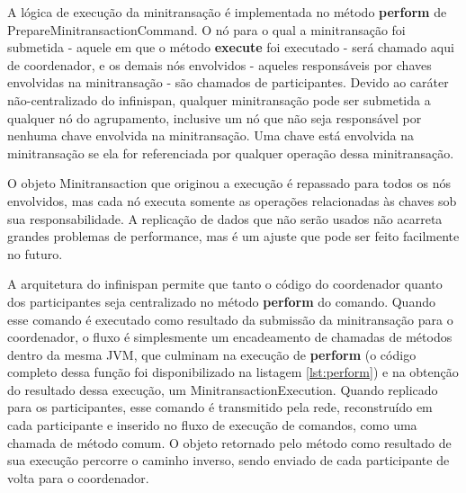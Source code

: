 \documentclass[11pt,twoside,a4paper]{book}
\begin{document}
A lógica de execução da minitransação é implementada no método \textbf{perform} de PrepareMinitransactionCommand. O nó para o qual a minitransação foi submetida - aquele em que o método \textbf{execute} foi executado - será chamado aqui de coordenador, e os demais nós envolvidos - aqueles responsáveis por chaves envolvidas na minitransação - são chamados de participantes. Devido ao caráter não-centralizado do infinispan, qualquer minitransação pode ser submetida a qualquer nó do agrupamento, inclusive um nó que não seja responsável por nenhuma chave envolvida na minitransação. Uma chave está envolvida na minitransação se ela for referenciada por qualquer operação dessa minitransação.

O objeto Minitransaction que originou a execução é repassado para todos os nós envolvidos, mas cada nó executa somente as operações relacionadas às chaves sob sua responsabilidade. A replicação de dados que não serão usados não acarreta grandes problemas de performance, mas é um ajuste que pode ser feito facilmente no futuro.

A arquitetura do infinispan permite que tanto o código do coordenador quanto dos participantes seja centralizado no método \textbf{perform} do comando. Quando esse comando é executado como resultado da submissão da minitransação para o coordenador, o fluxo é simplesmente um encadeamento de chamadas de métodos dentro da mesma JVM, que culminam na execução de \textbf{perform} (o código completo dessa função foi disponibilizado na listagem \ref{lst:perform}) e na obtenção do resultado dessa execução, um MinitransactionExecution. Quando replicado para os participantes, esse comando é transmitido pela rede, reconstruído em cada participante e inserido no fluxo de execução de comandos, como uma chamada de método comum. O objeto retornado pelo método como resultado de sua execução percorre o caminho inverso, sendo enviado de cada participante de volta para o coordenador.
\end{document}
